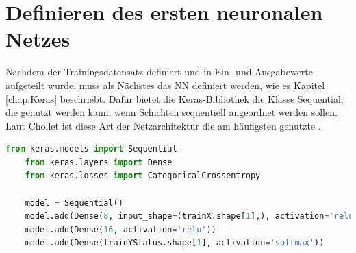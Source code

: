\section{Definieren des ersten neuronalen Netzes}
\label{chap:DefineNN}
Nachdem der Trainingsdatensatz definiert und in Ein- und Ausgabewerte aufgeteilt wurde, muss als Nächstes das \ac{NN} definiert werden, wie es Kapitel \ref{chap:Keras} beschriebt.
Dafür bietet die Keras-Bibliothek die Klasse \glqq Sequential\grqq{}, die genutzt werden kann, wenn Schichten sequentiell angeordnet werden sollen. Laut Chollet ist diese Art der 
Netzarchitektur die am häufigsten genutzte \cite[vgl. S.92]{DL_PY}. 

\begin{lstlisting}[language = python, caption={Erstellung eines sequentiellen Modells},captionpos=b, label = lst:ModellSeq, floatplacement=H]
    from keras.models import Sequential
    from keras.layers import Dense
    from keras.losses import CategoricalCrossentropy 

    model = Sequential()
    model.add(Dense(8, input_shape=(trainX.shape[1],), activation='relu'))
    model.add(Dense(16, activation='relu'))
    model.add(Dense(trainYStatus.shape[1], activation='softmax'))
\end{lstlisting}


